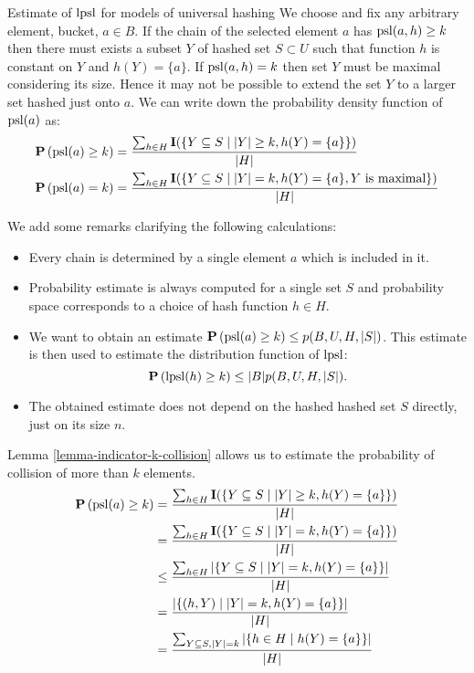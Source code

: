 \begin{section}{Estimate of $\mathrm{lpsl}$ for models of universal hashing}
We choose and fix any arbitrary element, bucket, $a \in B$. If the chain of the selected element $a$ has $\mathrm{psl}(a, h) \geq k$ then there must exists a subset $Y$ of hashed set $S \subset U$ such that function $h$ is constant on $Y$ and $h(Y) = \{ a \}$. If $\mathrm{psl}(a, h) = k$ then set $Y$ must be maximal considering its size. Hence it may not be possible to extend the set $Y$ to a larger set hashed just onto $a$. We can write down the probability density function of $\mathrm{psl}(a)$ as:
\begin{displaymath}
\begin{split}
\mathbf{P}\left(\mathrm{psl}(a) \geq k\right) & = \frac{\sum\displaylimits_{h \in H} \mathbf{I}(\{ Y \subseteq S \mid |Y| \geq k, h(Y) = \{ a \} \})}{|H|} \\
\mathbf{P}\left(\mathrm{psl}(a) = k\right) & = \frac{\sum\displaylimits_{h \in H} \mathbf{I}(\{ Y \subseteq S \mid |Y| = k, h(Y) = \{ a \}, Y \text{ is maximal} \})}{|H|} \\
\end{split}
\end{displaymath}

We add some remarks clarifying the following calculations:
\begin{itemize}
\item Every chain is determined by a single element $a$ which is included in it.
\item Probability estimate is always computed for a single set $S$ and probability space corresponds to a choice of hash function $h \in H$.
\item We want to obtain an estimate $\mathbf{P}\left(\mathrm{psl}(a) \geq k\right) \leq p(B, U, H, |S|)$. This estimate is then used to estimate the distribution function of $\mathrm{lpsl}$: \[ \mathbf{P}\left(\mathrm{lpsl}(h) \geq k\right) \leq |B| p(B, U, H, |S|) \text{.} \] 
\item The obtained estimate does not depend on the hashed hashed set $S$ directly, just on its size $n$.
\end{itemize}

Lemma \ref{lemma-indicator-k-collision} allows us to estimate the probability of collision of more than $k$ elements.
\begin{displaymath}
\begin{split}
\mathbf{P}\left(\mathrm{psl}(a) \geq k\right)
	& = \frac{\sum\displaylimits_{h \in H} \mathbf{I}(\{ Y \subseteq S \mid |Y| \geq k, h(Y) = \{ a \} \})}{|H|} \\
	& = \frac{\sum\displaylimits_{h \in H} \mathbf{I}(\{ Y \subseteq S \mid |Y| = k, h(Y) = \{ a \} \})}{|H|} \\
	& \leq \frac{\sum\displaylimits_{h \in H} |\{ Y \subseteq S \mid |Y| = k, h(Y) = \{ a \} \}|}{|H|} \\
	& = \frac{|\{ (h, Y) \mid |Y| = k, h(Y) = \{ a \} \}|}{|H|} \\
	& = \frac{\sum\displaylimits_{Y \subseteq S, |Y| = k} | \{ h \in H \mid h(Y) = \{a\} \}|}{|H|} \\
\end{split}
\end{displaymath}


\end{section}
